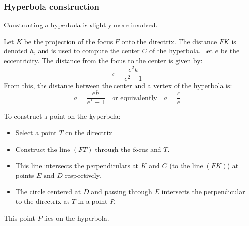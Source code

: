\subsubsection{Hyperbola construction}
\label{ssub:hyperbola_construction}

Constructing a hyperbola is slightly more involved.

Let $K$ be the projection of the focus $F$ onto the directrix. The distance $FK$ is denoted $h$, and is used to compute the center $C$ of the hyperbola. Let $e$ be the eccentricity. The distance from the focus to the center is given by:
\[
c = \dfrac{e^2 h}{e^2 - 1}
\]
From this, the distance between the center and a vertex of the hyperbola is:
\[
a = \dfrac{e h}{e^2 - 1} \quad \text{or equivalently} \quad a = \dfrac{c}{e}
\]

To construct a point on the hyperbola:
\begin{itemize}
  \item Select a point $T$ on the directrix.
  \item Construct the line $(FT)$ through the focus and $T$.
  \item This line intersects the perpendiculars at $K$ and $C$ (to the line $(FK)$) at points $E$ and $D$ respectively.
  \item The circle centered at $D$ and passing through $E$ intersects the perpendicular to the directrix at $T$ in a point $P$.
\end{itemize}

This point $P$ lies on the hyperbola.


  \begin{center}
  \end{center}

